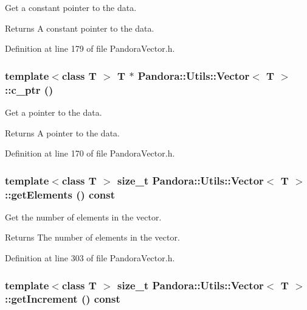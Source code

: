 Get a constant pointer to the data. \begin{DoxyReturn}{Returns}
A constant pointer to the data. 
\end{DoxyReturn}


Definition at line 179 of file PandoraVector.h.\hypertarget{classPandora_1_1Utils_1_1Vector_a9760f625847909ad7dc45a71742bbcc9}{
\subsubsection[{c\_\-ptr}]{\setlength{\rightskip}{0pt plus 5cm}template$<$class T $>$ T $\ast$ {\bf Pandora::Utils::Vector}$<$ T $>$::c\_\-ptr ()}}
\label{classPandora_1_1Utils_1_1Vector_a9760f625847909ad7dc45a71742bbcc9}


Get a pointer to the data. \begin{DoxyReturn}{Returns}
A pointer to the data. 
\end{DoxyReturn}


Definition at line 170 of file PandoraVector.h.\hypertarget{classPandora_1_1Utils_1_1Vector_a4d21fd9aff673df56471a9724b36fe2c}{
\subsubsection[{getElements}]{\setlength{\rightskip}{0pt plus 5cm}template$<$class T $>$ size\_\-t {\bf Pandora::Utils::Vector}$<$ T $>$::getElements () const}}
\label{classPandora_1_1Utils_1_1Vector_a4d21fd9aff673df56471a9724b36fe2c}


Get the number of elements in the vector. \begin{DoxyReturn}{Returns}
The number of elements in the vector. 
\end{DoxyReturn}


Definition at line 303 of file PandoraVector.h.\hypertarget{classPandora_1_1Utils_1_1Vector_aee155c4f9a304e540e359af6d3fec3d8}{
\subsubsection[{getIncrement}]{\setlength{\rightskip}{0pt plus 5cm}template$<$class T $>$ size\_\-t {\bf Pandora::Utils::Vector}$<$ T $>$::getIncrement () const}}
\label{classPandora_1_1Utils_1_1Vector_aee155c4f9a304e540e359af6d3fec3d8}


